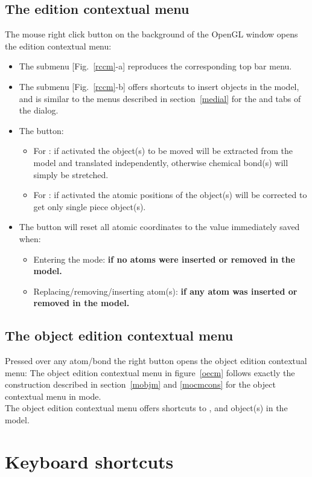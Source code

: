 \subsection{The edition contextual menu}

The mouse right click button on the background of the OpenGL window opens the edition contextual menu: \\
\rccmfig
\begin{itemize}
\item The  submenu [Fig.~\ref{rccm}-a] reproduces the corresponding top bar menu. 
\item The  submenu [Fig.~\ref{rccm}-b] offers shortcuts to insert objects in the model,
and is similar to the  menus described in section~\ref{medial} for the  and  tabs of the  dialog.
\item\label{erbt} The  button:
\begin{itemize}
\item For : if activated the object(s) to be moved will be extracted from the model and translated independently, 
otherwise chemical bond(s) will simply be stretched. 
\item For : if activated the atomic positions of the object(s) will be corrected to get only single piece object(s). 
\end{itemize}
\item The  button will reset all atomic coordinates to the value immediately saved when:
\begin{itemize}
\item Entering the  mode: {\bf{if no atoms were inserted or removed in the model.}}
\item Replacing/removing/inserting atom(s): {\bf{if any atom was inserted or removed in the model.}}
\end{itemize}
\end{itemize}

\subsection{The object edition contextual menu}
\label{mobje}
Pressed over any atom/bond the right button opens the object edition contextual menu: 
\oecmfig
\laf The object edition contextual menu in figure~\ref{oecm} follows exactly the construction described in section~\ref{mobjm} 
and \ref{mocmcons} for the object contextual menu in  mode. \\
The object edition contextual menu offers shortcuts to ,  and  object(s) in the model.

\clearpage

\section{Keyboard shortcuts}

\kbdedit
